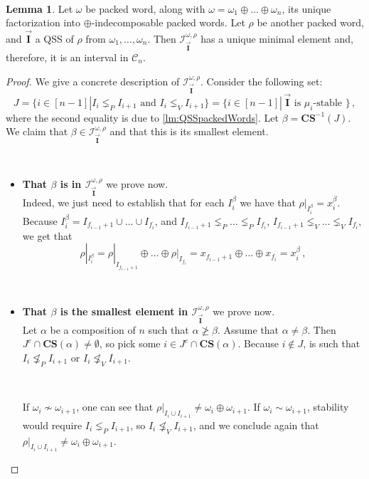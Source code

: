 \documentclass[12pt, reqno]{amsart}
\theoremstyle{definition}
\newtheorem{lm}[thm]{Lemma}
\newcommand{\III}{\vec{\mathbf{I}}}
\begin{document}
\

\begin{lm}\label{lm:minpacked}
Let $\omega$ be  packed word, along with $\omega = \omega_1 \oplus \dots \oplus \omega_n$, its unique factorization into $\oplus$-indecomposable packed words.
Let $\rho$ be another packed word, and $\III$ a QSS of $\rho$ from $\omega_1, \dots , \omega_n$. Then $\mathcal I^{\omega, \rho}_{\III}$ has a unique minimal element and, therefore, it is an interval in $\mathcal C_n$.
\end{lm}

\begin{proof}
We give a concrete description of $\mathcal I^{\omega, \rho}_{\III}$.
Consider the following set:
$$J = \{i \in [n-1] | I_i \lneq_P I_{i+1} \text{ and } I_i \lneq_V I_{i+1} \} = \{i \in [n-1] | \, \III \text{ is $\mu_i$-stable } \} \, ,$$
where the second equality is due to \cref{lm:QSSpackedWords}.
Let $\beta = \mathbf{CS}^{-1}( J)$. 
We claim that $\beta \in \mathcal I^{\omega, \rho}_{\III}$ and that this is its smallest element.

\
\begin{itemize}
\item {\bf That $\beta$ is in $\mathcal I^{\omega, \rho}_{\III}$} we prove now.\\
Indeed, we just need to establish that for each $I^{\beta}_i$ we have that $\rho|_{I^{\beta}_i} = x^{\beta}_i$.
Because $I^{\beta}_i = I_{f_{i-1} + 1} \cup \dots \cup I_{f_i}$, and $I_{f_{i-1} + 1} \lneq_P \dots \lneq_P I_{f_i}$, $I_{f_{i-1} + 1} \lneq_V \dots \lneq_V I_{f_i}$, we get that 
$$\rho|_{I^{\beta}_i} = \rho|_{I_{f_{i-1} + 1}} \oplus \dots \oplus \rho|_{I_{f_i}} = x_{f_{i-1} + 1} \oplus \dots\oplus x_{f_i} = x^{\beta}_i\,  ,$$

\

    \item {\bf That $\beta$ is the smallest element in $\mathcal I^{\omega, \rho}_{\III}$} we prove now. \\
Let $\alpha $ be a composition of $n$ such that $\alpha \not \geq \beta$.
Assume that $\alpha \neq \beta$. 
Then $J^c \cap \mathbf{CS}(\alpha)\neq \emptyset $, so pick some $i \in  J^c \cap \mathbf{CS}(\alpha) $.
Because $i \not\in J$, is such that $ I_i \not\lneq_P I_{i+1} \text{ or } I_i \not\lneq_V I_{i+1} $.

\

If $\omega_i \not\sim \omega_{i+1}$, one can see that $\rho|_{I_i \cup I_{i+1}} \neq \omega_i \oplus \omega_{i+1}$.
If $\omega_i \sim \omega_{i+1}$, stability would require $I_i \lneq_P I_{i+1}$, so $I_i \not\lneq_V I_{i+1}$, and we conclude again that $\rho|_{I_i \cup I_{i+1}} \neq \omega_i \oplus \omega_{i+1}$.


\end{itemize}
\end{proof}
\end{document}
